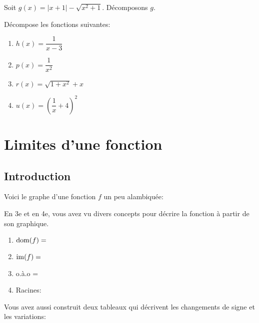 \documentclass[a4paper,12pt]{report}
\newcommand{\dom}{\mathrm{dom}}
\newcommand{\im}{\mathrm{im}}
\begin{document}
\begin{exemple}
Soit \(g(x)=|x+1|-\sqrt{x^2+1}\). Décomposons \(g\).
\vspace{10cm}
\end{exemple}

\begin{exercice}
Décompose les fonctions suivantes:
\par \setlength{\columnseprule}{0 pt}
          \begin{minipage}[t]{\linewidth}
          \begin{multicols}{2}
\begin{enumerate}
\item \(h(x)=\dfrac{1}{x-3}\)

\item \(p(x)=\dfrac{1}{x^2}\)

\item \(r(x)=\sqrt{1+x^2}+x\)

\item \(u(x)=\left(\dfrac{1}{x}+4\right)^2\)
\end{enumerate}


\end{multicols}\end{minipage}
\end{exercice}
\chapter{Limites d'une fonction}
\label{sec:org5091752}

\section{Introduction}
\label{sec:orga52d9b9}
Voici le graphe d'une fonction \(f\) un peu alambiquée:
\begin{center}

\end{center}

En 3e et en 4e, vous avez vu divers concepts pour décrire la fonction
à partir de son graphique.
\par \setlength{\columnseprule}{0 pt}
          \begin{minipage}[t]{\linewidth}
          \begin{multicols}{2}
\begin{enumerate}
\item \(\dom(f)=\dotfill\)
\item \(\im(f)=\dotfill\)
\item o.à.o = \dotfill
\item Racines:\dotfill
\end{enumerate}


\end{multicols}\end{minipage}
Vous avez aussi construit deux tableaux qui décrivent les changements
de signe et les variations:
\end{document}
